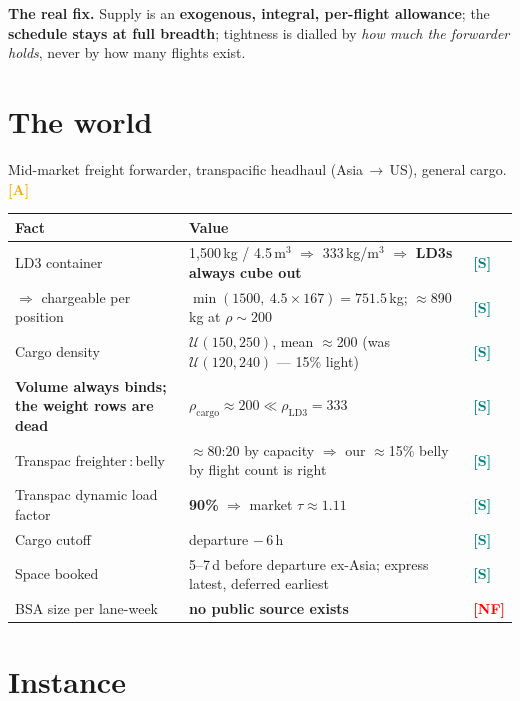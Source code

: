 \documentclass[11pt,a4paper]{article}
\newcommand{\tagS}{\textcolor{teal}{\textbf{[S]}}}
\newcommand{\tagA}{\textcolor{orange}{\textbf{[A]}}}
\newcommand{\tagNF}{\textcolor{red}{\textbf{[NF]}}}
\begin{document}
\textbf{The real fix.} Supply is an \textbf{exogenous, integral, per-flight allowance}; the
\textbf{schedule stays at full breadth}; tightness is dialled by \emph{how much the forwarder holds},
never by how many flights exist.

\section{The world}

Mid-market freight forwarder, transpacific headhaul (Asia\,$\to$\,US), general cargo. \tagA

\begin{center}
\begin{tabularx}{\textwidth}{@{}Lll@{}}
\toprule
\textbf{Fact} & \textbf{Value} & \\
\midrule
LD3 container & 1{,}500\,kg / 4.5\,m$^3$ $\Rightarrow$ 333\,kg/m$^3$ $\Rightarrow$ \textbf{LD3s always cube out} & \tagS \\
$\Rightarrow$ chargeable per position & $\min(1500,\ 4.5\times167) = 751.5$\,kg; $\approx$890\,kg at $\rho\!\sim\!200$ & \tagS \\
Cargo density & $\mathcal{U}(150,250)$, mean $\approx$200 (was $\mathcal{U}(120,240)$ --- 15\% light) & \tagS \\
\textbf{Volume always binds; the weight rows are dead} & $\rho_{\text{cargo}} \approx 200 \ll \rho_{\text{LD3}} = 333$ & \tagS \\
Transpac freighter\,:\,belly & $\approx$80:20 by capacity $\Rightarrow$ our $\approx$15\% belly by flight count is right & \tagS \\
Transpac dynamic load factor & \textbf{90\%} $\Rightarrow$ market $\tau \approx 1.11$ & \tagS \\
Cargo cutoff & departure $-\,6$\,h & \tagS \\
Space booked & 5--7\,d before departure ex-Asia; express latest, deferred earliest & \tagS \\
BSA size per lane-week & \textbf{no public source exists} & \tagNF \\
\bottomrule
\end{tabularx}
\end{center}

\section{Instance}
\end{document}
